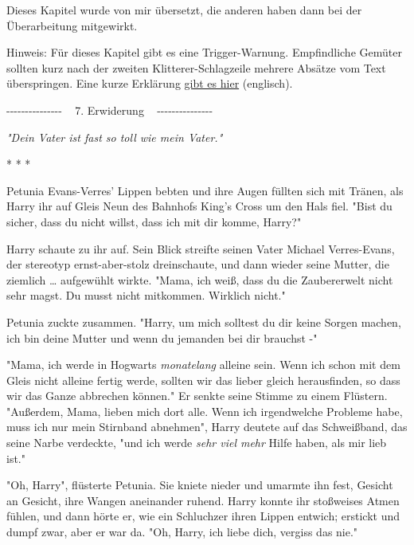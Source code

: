 

\hypertarget{erwiderung}{%

Dieses Kapitel wurde von mir übersetzt, die anderen haben dann bei der Überarbeitung mitgewirkt.

Hinweis: Für dieses Kapitel gibt es eine Trigger-Warnung. Empfindliche Gemüter sollten kurz nach der zweiten Klitterer-Schlagzeile mehrere Absätze vom Text überspringen. Eine kurze Erklärung \href{http://wiki.lesswrong.com/wiki/Methods_Of_Rationality_\%28fanfiction\%29/Nonconsent}{gibt es hier} (englisch).

-\/-\/-\/-\/-\/-\/-\/-\/-\/-\/-\/-\/-\/-\/- ~ 7. Erwiderung ~ -\/-\/-\/-\/-\/-\/-\/-\/-\/-\/-\/-\/-\/-\/-

\emph{"Dein Vater ist fast so toll wie mein Vater."}

* * *

Petunia Evans-Verres' Lippen bebten und ihre Augen füllten sich mit Tränen, als Harry ihr auf Gleis Neun des Bahnhofs King's Cross um den Hals fiel. "Bist du sicher, dass du nicht willst, dass ich mit dir komme, Harry?"

Harry schaute zu ihr auf. Sein Blick streifte seinen Vater Michael Verres-Evans, der stereotyp ernst-aber-stolz dreinschaute, und dann wieder seine Mutter, die ziemlich … aufgewühlt wirkte. "Mama, ich weiß, dass du die Zaubererwelt nicht sehr magst. Du musst nicht mitkommen. Wirklich nicht."

Petunia zuckte zusammen. "Harry, um mich solltest du dir keine Sorgen machen, ich bin deine Mutter und wenn du jemanden bei dir brauchst -"

"Mama, ich werde in Hogwarts \emph{monatelang} alleine sein. Wenn ich schon mit dem Gleis nicht alleine fertig werde, sollten wir das lieber gleich herausfinden, so dass wir das Ganze abbrechen können." Er senkte seine Stimme zu einem Flüstern. "Außerdem, Mama, lieben mich dort alle. Wenn ich irgendwelche Probleme habe, muss ich nur mein Stirnband abnehmen", Harry deutete auf das Schweißband, das seine Narbe verdeckte, "und ich werde \emph{sehr viel mehr} Hilfe haben, als mir lieb ist."

"Oh, Harry", flüsterte Petunia. Sie kniete nieder und umarmte ihn fest, Gesicht an Gesicht, ihre Wangen aneinander ruhend. Harry konnte ihr stoßweises Atmen fühlen, und dann hörte er, wie ein Schluchzer ihren Lippen entwich; erstickt und dumpf zwar, aber er war da. "Oh, Harry, ich liebe dich, vergiss das nie."

}
